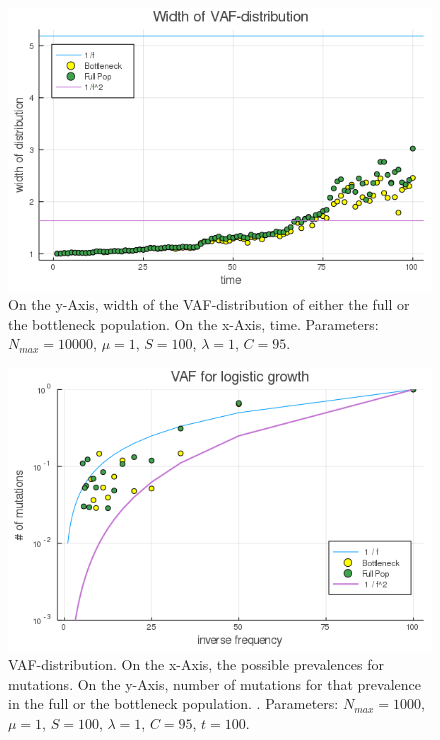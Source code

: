 \documentclass{article}
\numberwithin{equation}{subsection}
\begin{document}
\begin{figure}[h!]
	\centering
	\includegraphics[width=\linewidth]{Figures/LogGrowth/document/stable_soma/LogVarTimesAlt_N10000_mu1_t100_d32_C95}
	
	\caption{On the y-Axis, width of the VAF-distribution of either the full or the bottleneck population. On the x-Axis, time. Parameters: $ N_{max} = 10000$, $\mu = 1 $, $ S = 100 $, $ \lambda = 1$, $ C = 95 $.}
	\label{fig::WidthC2}
\end{figure}

\begin{figure}[h!]
	\centering
	\includegraphics[width=\linewidth]{Figures/LogGrowth/document/stable_soma/LogVarTimesC_N10000_mu1_t100_d32_C95}
	
	
	\caption{VAF-distribution. On the x-Axis, the possible prevalences for mutations. On the y-Axis, number of mutations for that prevalence in the full or the bottleneck population. . Parameters: $ N_{max} = 1000$, $\mu = 1 $, $ S = 100 $, $ \lambda = 1$, $C = 95 $,  $ t = 100 $.}
	\label{fig::VAFC2}
\end{figure}
	
\end{document}
